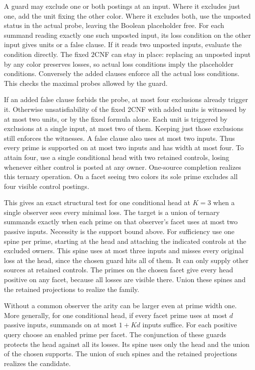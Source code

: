 A guard may exclude one or both postings at
an input. Where it excludes just one, add the
unit fixing the other color. Where it excludes
both, use the unposted status in the actual
probe, leaving the Boolean placeholder free.
For each summand reading exactly one such
unposted input, its loss condition on the
other input gives units or a false clause.
If it reads two unposted inputs, evaluate the
condition directly. The fixed $2$CNF can stay
in place: replacing an unposted input by any
color preserves losses, so actual loss
conditions imply the placeholder conditions.
Conversely the added clauses enforce all the
actual loss conditions. This checks the
maximal probes allowed by the guard.

If an added false clause forbids the probe,
at most four exclusions already trigger it.
Otherwise unsatisfiability of the fixed
$2$CNF with added units is witnessed by at
most two units, or by the fixed formula alone.
Each unit is triggered by exclusions at a single
input, at most two of them. Keeping just those
exclusions still enforces the witnesses. A false
clause also uses at most two inputs. Thus every
prime is supported on at most two inputs and
has width at most four. To attain four, use a single
conditional head with two retained controls,
losing whenever either control is posted
at any owner. One-source completion realizes
this ternary operation. On a facet seeing
two colors its sole prime excludes all four
visible control postings.

This gives an exact structural test for one
conditional head at $K=3$ when a single
observer sees every minimal loss. The target
is a union of ternary summands exactly when
each prime on that observer's facet uses at
most two passive inputs. Necessity is the
support bound above. For sufficiency use
one spine per prime, starting at the head
and attaching the indicated controls at the
excluded owners. This spine uses at most
three inputs and misses every original loss
at the head, since the chosen guard hits all
of them. It can only supply other sources
at retained controls. The primes on the
chosen facet give every head positive on
any facet, because all losses are visible
there. Union these spines and the retained
projections to realize the family.

Without a common observer the arity can be larger
even at prime width one. More generally, for one
conditional head, if every facet prime uses at
most $d$ passive inputs, summands on at most
$1+Kd$ inputs suffice. For each positive query
choose an enabled prime per facet. The conjunction
of these guards protects the head against all
its losses. Its spine uses only the head and
the union of the chosen supports. The union of
such spines and the retained projections
realizes the candidate.


